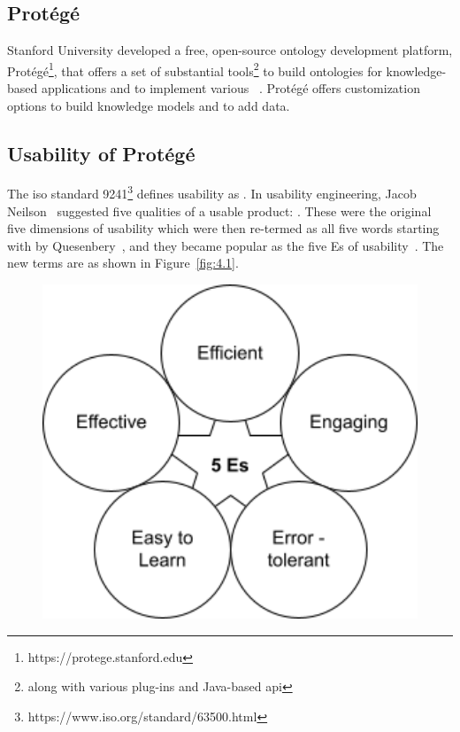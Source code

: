 \begin{doublespace}
\section{Protégé}
\par Stanford University developed a free, open-source ontology development platform, Protégé\footnote{https://protege.stanford.edu}, that offers a set of substantial tools\footnote{along with various plug-ins and Java-based \ac{api}} to build ontologies for knowledge-based applications and to implement various ~\cite{alatrish2013comparison}. Protégé offers customization options to build knowledge models and to add data. 
\subsection{Usability of Protégé}
\par The \ac{iso} standard 9241\footnote{https://www.iso.org/standard/63500.html} defines usability as . In usability engineering, Jacob Neilson~\cite{neilson1994usability} suggested five qualities of a usable product: . These were the original five dimensions of usability which were then re-termed as all five words starting with  by Quesenbery~\cite{quesenbery2003dimensions}, and they became popular as the five Es of usability~\cite{quesenbery2003dimensions}. The new terms are as shown in Figure~\ref{fig:4.1}.
\begin{figure}[htp]
    \centering
    \includegraphics[width=12cm]{images/ch4/Figure1.png}

\end{figure}
\end{doublespace}
